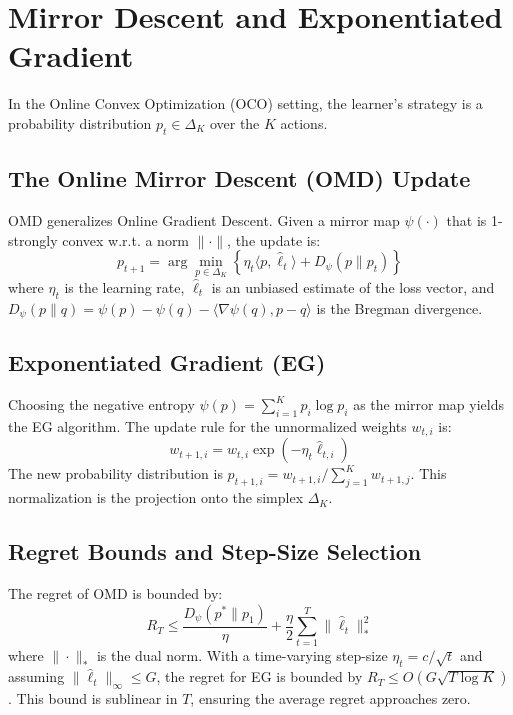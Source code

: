 \documentclass{article}
\begin{document}
\section{Mirror Descent and Exponentiated Gradient}
In the Online Convex Optimization (OCO) setting, the learner's strategy is a probability distribution $p_t \in \Delta_K$ over the $K$ actions.

\subsection{The Online Mirror Descent (OMD) Update}
OMD generalizes Online Gradient Descent. Given a mirror map $\psi(\cdot)$ that is 1-strongly convex w.r.t. a norm $\|\cdot\|$, the update is:
\begin{equation}
    p_{t+1} = \arg\min_{p \in \Delta_K} \left\{ \eta_t \langle p, \hat{\ell}_t \rangle + D_\psi(p \| p_t) \right\}
\end{equation}
where $\eta_t$ is the learning rate, $\hat{\ell}_t$ is an unbiased estimate of the loss vector, and $D_\psi(p \| q) = \psi(p) - \psi(q) - \langle \nabla\psi(q), p - q \rangle$ is the Bregman divergence.

\subsection{Exponentiated Gradient (EG)}
Choosing the negative entropy $\psi(p) = \sum_{i=1}^K p_i \log p_i$ as the mirror map yields the EG algorithm. The update rule for the unnormalized weights $w_{t,i}$ is:
\begin{equation}
    w_{t+1, i} = w_{t, i} \exp(-\eta_t \hat{\ell}_{t, i})
\end{equation}
The new probability distribution is $p_{t+1, i} = w_{t+1, i} / \sum_{j=1}^K w_{t+1, j}$. This normalization is the projection onto the simplex $\Delta_K$.

\subsection{Regret Bounds and Step-Size Selection}
The regret of OMD is bounded by:
\begin{equation}
    R_T \le \frac{D_\psi(p^* \| p_1)}{\eta} + \frac{\eta}{2} \sum_{t=1}^T \|\hat{\ell}_t\|_*^2
\end{equation}
where $\|\cdot\|_*$ is the dual norm. With a time-varying step-size $\eta_t = c/\sqrt{t}$ and assuming $\|\hat{\ell}_t\|_\infty \le G$, the regret for EG is bounded by $R_T \le O(G\sqrt{T \log K})$. This bound is sublinear in $T$, ensuring the average regret approaches zero.
\end{document}

